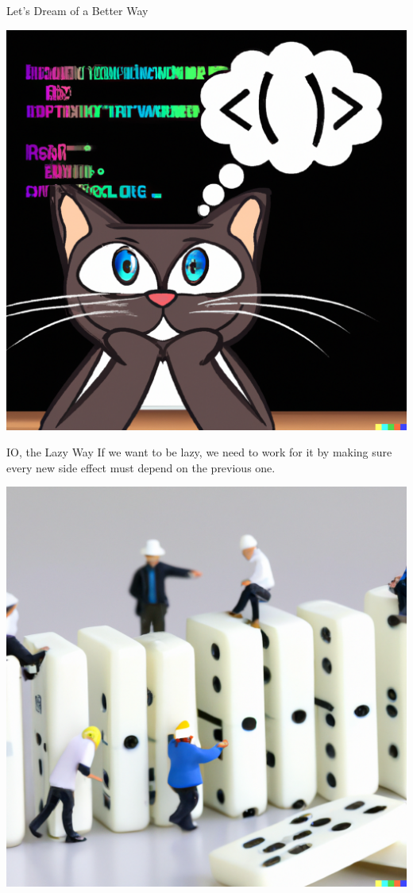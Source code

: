 \documentclass[10pt, presentation, colorlinks]{beamer}
\begin{document}
\begin{frame}[label={sec:org080e5ee}]{Let's Dream of a Better Way}
\begin{center}
\includegraphics[height=0.6\textheight]{./img/dreaming.png}
\end{center}
\end{frame}

\begin{frame}[label={sec:orge7ced84}]{IO, the Lazy Way}
If we want to be lazy, we need to work for it by making sure every new
side effect \alert{must depend on} the previous one.

\begin{center}
\includegraphics[height=0.6\textheight]{./img/dominos.png}
\end{center}
\end{frame}
\end{document}
